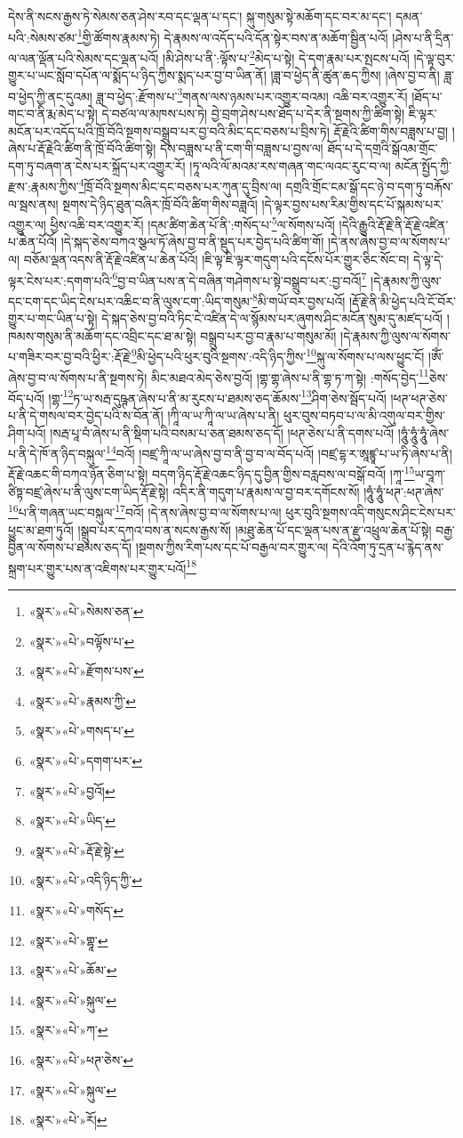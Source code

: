 དེས་ནི་སངས་རྒྱས་ཏེ་སེམས་ཅན་ཤེས་རབ་དང་ལྡན་པ་དང་། སྐུ་གསུམ་སྟེ་མཆོག་དང་བར་མ་དང་། དམན་པའི་:སེམས་ཙམ་\footnote{«སྣར་»«པེ་»སེམས་ཅན་}གྱི་ཚོགས་རྣམས་ཏེ། དེ་རྣམས་ལ་འདོད་པའི་དོན་སྟེར་བས་ན་མཆོག་སྦྱིན་པའོ། །ཤེས་པ་ནི་དྲིན་ལ་ལན་ལྡོན་པའི་སེམས་དང་ལྡན་པའོ། །མི་ཤེས་པ་ནི་:ལྟོས་པ་\footnote{«སྣར་»«པེ་»བལྟོས་པ་}མེད་པ་སྟེ། དེ་དག་རྣམ་པར་སྤངས་པའོ། །དེ་ལྟ་བུར་གྱུར་པ་ཡང་སློབ་དཔོན་ལ་སྨོད་པ་ཉིད་ཀྱིས་སྨད་པར་བྱ་བ་ཡིན་ནོ། །ཟླ་བ་ཕྱེད་ནི་ཚུན་ཆད་ཀྱིས། །ཞེས་བྱ་བ་ནི། ཟླ་བ་ཕྱེད་ཀྱི་ནང་དུའམ། ཟླ་བ་ཕྱེད་:རྫོགས་པ་\footnote{«སྣར་»«པེ་»རྫོགས་པས་}གནས་ལས་ཉམས་པར་འགྱུར་བའམ། འཆི་བར་འགྱུར་རོ། །ཐོད་པ་གང་བ་ནི་རྨ་མེད་པ་སྟེ། དེ་བཙལ་ལ་མཁས་པས་ཏེ། བྱེ་བྲག་ཤེས་པས་ཐོད་པ་དེར་ནི་སྔགས་ཀྱི་ཚིག་སྟེ། ཇི་ལྟར་མངོན་པར་འདོད་པའི་ཁྲོ་བོའི་སྔགས་བསྒྲུབ་པར་བྱ་བའི་མིང་དང་བཅས་པ་བྲིས་ཏེ། རྡོ་རྗེའི་ཚིག་གིས་བཟླས་པ་བྱ། །ཞེས་པ་རྡོ་རྗེའི་ཚིག་ནི་ཁྲོ་བོའི་ཚིག་སྟེ། དེས་བཟླས་པ་ནི་ངག་གི་བཟླས་པ་བྱས་ལ། ཐོད་པ་དེ་དགྲའི་སྒོའམ་གྲོང་དག་ཏུ་བཞག་ན་ངེས་པར་སྐྲོད་པར་འགྱུར་རོ། །ཏཱ་ལའི་ལོ་མའམ་རས་གཞན་གང་ལའང་རུང་བ་ལ། མངོན་སྤྱོད་ཀྱི་རྫས་:རྣམས་ཀྱིས་\footnote{«སྣར་»«པེ་»རྣམས་ཀྱི་}ཁྲོ་བོའི་སྔགས་མིང་དང་བཅས་པར་ཀུན་དུ་བྲིས་ལ། དགྲའི་གྲོང་ངམ་སྒོ་དང་ཉེ་བ་དག་ཏུ་བརྐོས་ལ་སྦས་ནས། སྔགས་དེ་ཉིད་ཐུན་བཞིར་ཁྲོ་བོའི་ཚིག་གིས་བཟླའོ། །དེ་ལྟར་བྱས་པས་རིམ་གྱིས་དང་པོ་སྐམས་པར་འགྱུར་ལ། ཕྱིས་འཆི་བར་འགྱུར་རོ། །དམ་ཚིག་ཆེན་པོ་ནི་:གསོད་པ་\footnote{«སྣར་»«པེ་»གསད་པ་}ལ་སོགས་པའོ། །དེའི་རྒྱུའི་རྡོ་རྗེ་ནི་རྡོ་རྗེ་འཛིན་པ་ཆེན་པོའོ། །དེ་སྐད་ཅེས་བཀའ་སྩལ་ཏོ་ཞེས་བྱ་བ་ནི་སྡུད་པར་བྱེད་པའི་ཚིག་གོ། །དེ་ནས་ཞེས་བྱ་བ་ལ་སོགས་པ་ལ། བཅོམ་ལྡན་འདས་ནི་རྡོ་རྗེ་འཛིན་པ་ཆེན་པོའོ། །ཇི་ལྟ་ཇི་ལྟར་གདུག་པའི་དངོས་པོར་གྱུར་ཅིང་སོང་བ། དེ་ལྟ་དེ་ལྟར་ངེས་པར་:དགག་པའི་\footnote{«སྣར་»«པེ་»དགག་པར་}བྱ་བ་ཡིན་པས་ན་དེ་བཞིན་གཤེགས་པ་སྟེ་བསྒྲུབ་པར་:བྱ་བའོ།\footnote{«སྣར་»«པེ་»བྱའོ།} །དེ་རྣམས་ཀྱི་ལུས་དང་ངག་དང་ཡིད་ངེས་པར་འཆིང་བ་ནི་ལུས་ངག་:ཡིད་གསུམ་\footnote{«སྣར་»«པེ་»ཡིད་}མི་གཡོ་བར་བྱས་པའོ། །རྡོ་རྗེ་ནི་མི་ཕྱེད་པའི་ངོ་བོར་གྱུར་པ་གང་ཡིན་པ་སྟེ། དེ་སྐད་ཅེས་བྱ་བའི་ཏིང་ངེ་འཛིན་དེ་ལ་སྙོམས་པར་ཞུགས་ཤིང་མངོན་སུམ་དུ་མཛད་པའོ། །ཁམས་གསུམ་ནི་མཆོག་དང་འབྲིང་དང་ཐ་མ་སྟེ། བསྒྲུབ་པར་བྱ་བ་རྣམ་པ་གསུམ་མོ། །དེ་རྣམས་ཀྱི་ལུས་ལ་སོགས་པ་གཟིར་བར་བྱ་བའི་ཕྱིར་:རྡོ་རྗེ་\footnote{«སྣར་»«པེ་»རྡོ་རྗེ་སྟེ་}མི་ཕྱེད་པའི་ཕུར་བུའི་སྔགས་:འདི་ཉིད་ཀྱིས་\footnote{«སྣར་»«པེ་»འདི་ཉིད་ཀྱི་}སྐུ་ལ་སོགས་པ་ལས་ཕྱུང་ངོ། །ཨོཾ་ཞེས་བྱ་བ་ལ་སོགས་པ་ནི་སྔགས་ཏེ། མིང་མཐའ་མེད་ཅེས་བྱའོ། །གྷ་གྷ་ཞེས་པ་ནི་གྷ་ཏ་ཀ་སྟེ། :གསོད་བྱེད་\footnote{«སྣར་»«པེ་»གསོད་}ཅེས་བོད་པའོ། །གྷ་\footnote{«སྣར་»«པེ་»གྷཱ་}ཏ་ཡ་སརྦ་དུཥྚན་ཞེས་པ་ནི་མ་རུངས་པ་ཐམས་ཅད་ཆོམས་\footnote{«སྣར་»«པེ་»ཆོམ་}ཤིག་ཅེས་སྦོད་པའོ། །ཕཊ་ཕཊ་ཅེས་པ་ནི་དེ་གསལ་བར་བྱེད་པའི་ས་བོན་ནོ། །ཀཱི་ལ་ཡ་ཀཱི་ལ་ཡ་ཞེས་པ་ནི། ཕུར་བུས་བཏབ་པ་ལ་མི་འགུལ་བར་གྱིས་ཤིག་པའོ། །སརྦ་པཱ་བཾ་ཞེས་པ་ནི་སྡིག་པའི་བསམ་པ་ཅན་ཐམས་ཅད་དོ། །ཕཊ་ཅེས་པ་ནི་དགས་པའོ། །ཧཱུཾ་ཧཱུཾ་ཧཱུཾ་ཞེས་པ་ནི་དེ་ཁོ་ན་ཉིད་བསྐུལ་\footnote{«སྣར་»«པེ་»སྐུལ་}བའོ། །བཛྲ་ཀཱི་ལ་ཡ་ཞེས་བྱ་བ་ནི་བྱ་བ་ལ་བོད་པའོ། །བཛྲ་དྷ་ར་ཨཱཛྙཱ་པ་ཡ་ཏི་ཞེས་པ་ནི། རྡོ་རྗེ་འཆང་གི་བཀའ་ཉོན་ཅིག་པ་སྟེ། བདག་ཉིད་རྡོ་རྗེ་འཆང་ཉིད་དུ་བྱིན་གྱིས་བརླབས་ལ་བསྒོ་བའོ། །ཀཱ་\footnote{«སྣར་»«པེ་»ཀ་}ཡ་བཱཀ་ཙིཏྟ་བཛྲ་ཞེས་པ་ནི་ལུས་ངག་ཡིད་རྡོ་རྗེ་སྟེ། འདིར་ནི་གདུག་པ་རྣམས་ལ་བྱ་བར་དགོངས་སོ། །ཧཱུཾ་ཧཱུཾ་ཕཊ་:ཕཊ་ཞེས་\footnote{«སྣར་»«པེ་»ཕཊ་ཅེས་}པ་ནི་གཞན་ཡང་བསྐུལ་\footnote{«སྣར་»«པེ་»སྐུལ་}བའོ། །དེ་ནས་ཞེས་བྱ་བ་ལ་སོགས་པ་ལ། ཕུར་བུའི་སྔགས་འདི་གསུངས་ཤིང་ངེས་པར་ཕྱུང་མ་ཐག་ཏུའོ། །སྒྲུབ་པར་དཀའ་བས་ན་སངས་རྒྱས་སོ། །མཐུ་ཆེན་པོ་དང་ལྡན་པས་ན་རྫུ་འཕྲུལ་ཆེན་པོ་སྟེ། བརྒྱ་བྱིན་ལ་སོགས་པ་ཐམས་ཅད་དོ། །སྔགས་ཀྱིས་རིག་པས་དང་པོ་བརྒྱལ་བར་གྱུར་ལ། དེའི་འོག་ཏུ་དྲན་པ་རྙེད་ནས་སྐྲག་པར་གྱུར་པས་ན་འཇིགས་པར་གྱུར་པའོ།\footnote{«སྣར་»«པེ་»རོ།} 